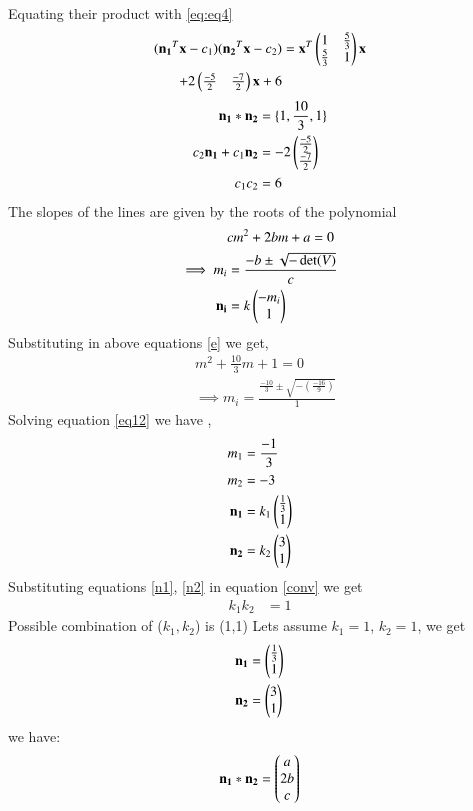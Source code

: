 \documentclass[journal,12pt,twocolumn]{IEEEtran}
\begin{document}
Equating their product with \eqref{eq:eq4}
\begin{align}
(\mathbf{n_1}^T\mathbf{x}-c_1)(\mathbf{n_2}^T\mathbf{x}-c_2) &=\mathbf{x}^T\begin{pmatrix}1 & \frac{5}{3} \\\frac{5}{3} & 1\end{pmatrix}\mathbf{x}\notag\\
+2\begin{pmatrix}\frac{-5}{2} & \frac{-7}{2}\end{pmatrix}\mathbf{x}+6\label{86}
\end{align}
\begin{align}
    \mathbf{n_1}*\mathbf{n_2}&=\{1,\frac{10}{3},1\}\label{conv}\\
    c_2\mathbf{n_1}+c_1\mathbf{n_2}&=-2\begin{pmatrix}\frac{-5}{2}\\\frac{-7}{2}\end{pmatrix}\label{eq98}\\
    c_1c_2&=6
\end{align}
The slopes of the lines are given by the roots of the polynomial 
\begin{align}
    &cm^2+2bm+a=0\label{e}\\
    \implies m_i&=\frac{-b\pm{\sqrt{-\det(V)}}}{c}\\
    \mathbf{n_i}&=k\begin{pmatrix}-m_i\\1\end{pmatrix}
\end{align}
Substituting  in above equations \eqref{e} we get,
\begin{align}
    &m^2+\frac{10}{3}m+1=0\\
    &\implies m_i=\frac{\frac{-10}{3}\pm{\sqrt{-(\frac{-16}{9})}}}{1}\label{eq12}
\end{align}
Solving equation \eqref{eq12} we have ,
\begin{align}
    m_1&=\frac{-1}{3}\\
    m_2&=-3\\
    \mathbf{n_1}&=k_1\begin{pmatrix}\frac{1}{3}\\1\end{pmatrix}\label{n1}\\
    \mathbf{n_2}&=k_2\begin{pmatrix}{3}\\1\end{pmatrix}\label{n2}
\end{align}
Substituting equations \eqref{n1}, \eqref{n2} in equation \eqref{conv} we get 
\begin{align}
    k_1k_2&=1
\end{align}
Possible combination of ($k_1,k_2$) is (1,1)
Lets assume $k_1=1$, $k_2=1$, we get 
\begin{align}
    \mathbf{n_1}&=\begin{pmatrix}\frac{1}{3} \\1\end{pmatrix}\label{n11}\\
    \mathbf{n_2}&=\begin{pmatrix}3\\1\end{pmatrix}\label{n22}
\end{align}
we have:
\begin{align}
\mathbf{n_1}\ast \mathbf{n_2} = \begin{pmatrix}a\\2b\\c\end{pmatrix} \label{eq:conv1}
\end{align}
\end{document}
